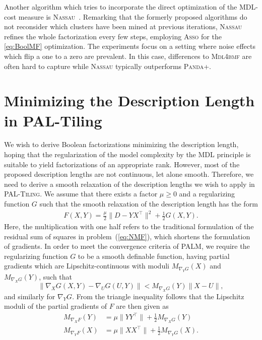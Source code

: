 Another algorithm which tries to incorporate the direct optimization of the MDL-cost measure is \textsc{Nassau}~\citep{karaev2015getting}. Remarking that the formerly proposed algorithms do not reconsider which clusters have been mined at previous iterations, \textsc{Nassau} refines the whole factorization every few steps, employing \textsc{Asso} for the \ref{eq:BoolMF} optimization. The experiments focus on a setting where noise effects which flip a one to a zero are prevalent. In this case, differences to \textsc{Mdl4bmf} are often hard to capture while \textsc{Nassau} typically outperforms \textsc{Panda+}. 

\section{Minimizing the Description Length in PAL-Tiling}
We wish to derive Boolean factorizations minimizing the description length, hoping that the regularization of the model complexity by the MDL principle is suitable to yield factorizations of an appropriate rank. However, most of the proposed description lengths are not continuous, let alone smooth. Therefore, we need to derive  a smooth relaxation of the description lengths we wish to apply in \textsc{PAL-Tiling}. We assume that there exists a factor $\mu\geq 0$ and a regularizing function $G$ such that the smooth relaxation of the description length has the form 
\begin{align}\label{eq:MDL:F}
	F(X,Y)= \frac{\mu}{2}\bigl \lVert D-YX^\top \bigr \rVert ^2 + \frac{1}{2} G(X,Y).
\end{align} 
Here, the multiplication with one half refers to the traditional formulation of the residual sum of squares in problem~(\ref{eq:NMF}), which shortens the formulation of gradients. 
In order to meet the convergence criteria of PALM, we require the regularizing function $G$ to be a smooth definable function, having partial gradients which are Lipschitz-continuous with moduli $M_{\nabla_YG}(X)$ and $M_{\nabla_XG}(Y)$, such that
\[\lVert \nabla_XG(X,Y)-\nabla_UG(U,Y)\rVert < M_{\nabla_XG}(Y)\lVert X-U\rVert ,\]
and similarly for $\nabla_YG$. From the triangle inequality follows that the Lipschitz moduli of the partial gradients of $F$ are then given as
\begin{align*}
M_{\nabla_XF}(Y) &= \mu\bigl \lVert YY^\top \bigr \rVert  + \frac{1}{2}M_{\nabla_XG}(Y)\\ 
M_{\nabla_YF}(X) &= \mu\bigl \lVert XX^\top \bigr \rVert  + \frac{1}{2}M_{\nabla_YG}(X).
\end{align*}

